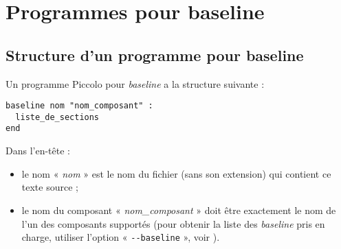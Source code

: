 
\cleardoublepage

\chapter{Programmes pour baseline}

\thispagestyle{empty}




\section{Structure d’un programme pour baseline}

Un programme Piccolo pour \emph{baseline} a la structure suivante :

\begin{lstlisting}[language=piccolo]
baseline nom "nom_composant" :
  liste_de_sections
end
\end{lstlisting}


Dans l’en-tête :
\begin{itemize}
  \item le nom « \emph{nom} » est le nom du fichier (sans son extension) qui contient ce texte source ;
  \item le nom du composant « \emph{nom\_composant} » doit être exactement le nom de l’un des composants supportés (pour obtenir la liste des \emph{baseline} pris en charge, utiliser l’option « \texttt{-{}-baseline} », voir ).
\end{itemize}


